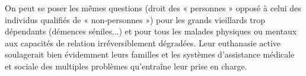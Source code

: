  On peut se poser les mêmes questions (droit des « personnes » opposé à celui des individus qualifiés de « non-personnes ») pour les grands vieillards trop dépendants (démences séniles...) et pour tous les malades physiques ou mentaux aux capacités de relation irréversiblement dégradées. Leur euthanasie active soulagerait bien évidemment leurs familles et les systèmes d'assistance médicale et sociale des multiples problèmes qu'entraîne leur prise en charge.
 
 